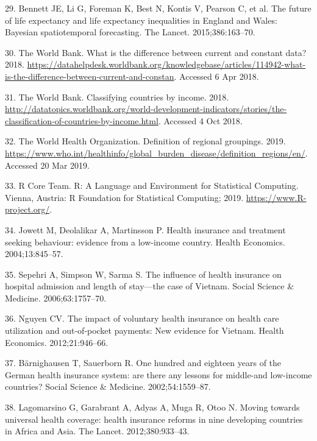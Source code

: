 \documentclass[]{elsarticle} %
\begin{document}
\leavevmode\hypertarget{ref-bennett2015future}{}%
29. Bennett JE, Li G, Foreman K, Best N, Kontis V, Pearson C, et al. The future of life expectancy and life expectancy inequalities in England and Wales: Bayesian spatiotemporal forecasting. The Lancet. 2015;386:163--70.

\leavevmode\hypertarget{ref-worldbankconstant}{}%
30. The World Bank. What is the difference between current and constant data? 2018. \url{https://datahelpdesk.worldbank.org/knowledgebase/articles/114942-what-is-the-difference-between-current-and-constan}. Accessed 6 Apr 2018.

\leavevmode\hypertarget{ref-worldbankincome}{}%
31. The World Bank. Classifying countries by income. 2018. \url{http://datatopics.worldbank.org/world-development-indicators/stories/the-classification-of-countries-by-income.html}. Accessed 4 Oct 2018.

\leavevmode\hypertarget{ref-WHOregion}{}%
32. The World Health Organization. Definition of regional groupings. 2019. \url{https://www.who.int/healthinfo/global_burden_disease/definition_regions/en/}. Accessed 20 Mar 2019.

\leavevmode\hypertarget{ref-R353}{}%
33. R Core Team. R: A Language and Environment for Statistical Computing. Vienna, Austria: R Foundation for Statistical Computing; 2019. \url{https://www.R-project.org/}.

\leavevmode\hypertarget{ref-jowett2004health}{}%
34. Jowett M, Deolalikar A, Martinsson P. Health insurance and treatment seeking behaviour: evidence from a low-income country. Health Economics. 2004;13:845--57.

\leavevmode\hypertarget{ref-sepehri2006influence}{}%
35. Sepehri A, Simpson W, Sarma S. The influence of health insurance on hospital admission and length of stay---the case of Vietnam. Social Science \& Medicine. 2006;63:1757--70.

\leavevmode\hypertarget{ref-Nguyen2012}{}%
36. Nguyen CV. The impact of voluntary health insurance on health care utilization and out‐of‐pocket payments: New evidence for Vietnam. Health Economics. 2012;21:946--66.

\leavevmode\hypertarget{ref-barnighausen2002one}{}%
37. Bärnighausen T, Sauerborn R. One hundred and eighteen years of the German health insurance system: are there any lessons for middle-and low-income countries? Social Science \& Medicine. 2002;54:1559--87.

\leavevmode\hypertarget{ref-lagomarsino2012moving}{}%
38. Lagomarsino G, Garabrant A, Adyas A, Muga R, Otoo N. Moving towards universal health coverage: health insurance reforms in nine developing countries in Africa and Asia. The Lancet. 2012;380:933--43.
\end{document}
